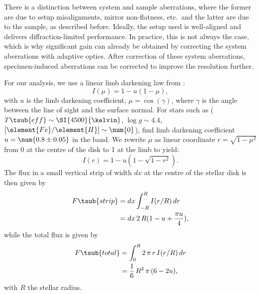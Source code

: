 There is a distinction between system and sample aberrations, where the former are due to setup misalignments, mirror non-flatness, etc.\ and the latter are due to the sample, as described before.
Ideally, the setup used is well-aligned and delivers diffraction-limited performance.
In practice, this is not always the case, which is why significant gain can already be obtained by correcting the system aberrations with adaptive optics.
After correction of these system aberrations, specimen-induced aberrations can be corrected to improve the resolution further.


For our analysis, we use a linear limb darkening law from \citet{claret2011}:
\begin{equation}
	I(\mu) = 1 - u(1-\mu),
\end{equation}
with $u$ is the limb darkening coefficient, $\mu = \cos(\gamma)$, where $\gamma$ is the angle between the line of sight and the surface normal.
For stars such as \swtgtshort ($T\tsub{eff} \sim \SI{4500}{\kelvin}$, $\log g \sim \num{4.4}$, $[\element{Fe}/\element{H}] \sim \num{0}$), \citet{claret2011} find limb darkening coefficient $u = \num{0.8 \pm 0.05}$ in the \swasp band.
We rewrite $\mu$ as linear coordinate $r = \sqrt{1-\mu^2}$ from \num{0} at the centre of the disk to \num{1} at the limb to yield:
\begin{equation}
	I(r) = 1 - u ( 1 - \sqrt{1-r^2}).
\end{equation}
The flux in a small vertical strip of width $dx$ at the centre of the stellar disk is then given by
\begin{align}
	\nonumber F\tsub{strip} &= dx \int_{-R}^{R} I(r/R) \, dr\\
	                        &= dx \,2 \, R ( 1 - u + \frac{\mathrm\pi u}{4}),
\end{align}
while the total flux is given by 
\begin{align}
	\nonumber F\tsub{total} &= \int_0^R 2 \, \mathrm\pi \, r \, I(r/R) \, dr \\
	                        &= \frac{1}{6} \, R^2 \, \mathrm\pi\,  (6 - 2 u),
\end{align}
with $R$ the stellar radius.

